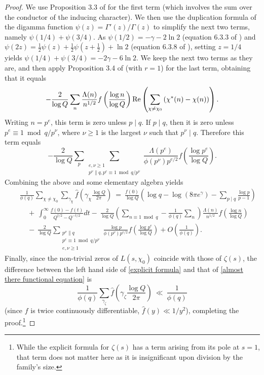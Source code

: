 \documentclass[12pt,reqno]{amsart}
\numberwithin{equation}{section}
\theoremstyle{plain}
\begin{document}
\begin{proof}
We use Proposition 3.3 of \cite{FiMa} for the first term (which involves the sum over the conductor of the inducing character). We then use the duplication formula of the digamma function $\psi(z) = \Gamma'(z)/\Gamma(z)$ to simplify the next two terms, namely $\psi(1/4) + \psi(3/4)$. As $\psi(1/2) = -\gamma-2\ln 2$ (equation 6.3.3 of \cite{AS}) and $\psi(2z) = \frac12\psi(z) + \frac12\psi(z+\frac12)+\ln 2$ (equation 6.3.8 of \cite{AS}), setting $z=1/4$ yields $\psi(1/4)+\psi(3/4) = -2\gamma -6\ln 2$. We keep the next two terms as they are, and then apply Proposition 3.4 of \cite{FiMa} (with $r=1$) for the last term, obtaining that it equals
\begin{equation} -\frac{2}{\log Q} \sum_n \frac{\Lambda(n)}{n^{1/2}} f\left(\frac{\log n}{\log Q}\right) {\rm Re}\left(    \sum_{\chi\neq \chi_0}   \left(\chi^*(n)-\chi(n)\right)\right). \end{equation}
Writing $n=p^e$, this term is zero unless $p\mid q$. If $p\mid q$, then it is zero unless $p^e\equiv 1 \bmod
q/p^\nu$, where $\nu\geq 1$ is the largest $\nu$ such that $p^\nu\mid q$. Therefore this term equals
\begin{equation} -\frac{2}{\log Q} \sum_p \sum_{\substack{e, \nu \ge 1 \\ p^\nu \parallel q, p^e \equiv 1 \bmod q/p^\nu}} \frac{\Lambda(p^e)}{
\phi(p^\nu)p^{e/2}} f\left(\frac{\log p^e}{\log Q}\right).\end{equation} Combining the above and some elementary algebra yields
\begin{eqnarray} & & \frac 1{\phi(q)}\sum_{\chi \neq \chi_0} \sum_{\gamma_{\chi}} \widehat{f}\left(
\gamma_{\chi} \frac{\log Q}{2\pi} \right) \ = \ \frac{f(0)}{\log Q} \left(  \log q -\log(8\pi e^{\gamma})-\sum_{p\mid q}\frac{\log p}{p-1}\right) \nonumber\\
& & \ \ \ \ \ + \ \int_0^{\infty}\frac{f(0)-f(t)}{Q^{t/2}-Q^{-t/2}} dt  - \ \frac 2{\log Q} \left(\sum_{n\equiv 1 \bmod q} - \frac 1{\phi(q)}\sum_n \right) \frac{\Lambda(n)}{n^{1/2}}f\left( \frac{\log n}{\log Q}\right) \nonumber\\
& & \ \ \ \ \ - \ \frac 2{\log Q} \sum_{\substack{p^{\nu}\parallel q \\ p^e \equiv 1 \bmod q/p^{\nu} \\ e, \nu\geq 1}}\frac{\log p}{\phi(p^{\nu})p^{e/2}}f\left( \frac{\log p^{e}}{\log Q}\right)   +O\left(\frac 1{\phi(q)}\right).
\label{almost there functional equation}
\end{eqnarray}
Finally, since the non-trivial zeros of $L(s,\chi_0)$ coincide with those of $\zeta(s)$, the difference between the left hand side of \eqref{explicit formula} and that of \eqref{almost there functional equation} is
\begin{equation} \frac 1{\phi(q)} \sum_{\gamma_\zeta} \widehat{f}\left(
\gamma_\zeta \frac{\log Q}{2\pi} \right)\ \ll\ \frac 1{\phi(q)}\end{equation}
(since $f$ is twice continuously differentiable, $\widehat{f}(y) \ll 1/y^2$),
completing the proof.\footnote{While the explicit formula for $\zeta(s)$ has a term arising from its pole at $s=1$, that term does not matter here as it is insignificant upon division by the family's size.}
\end{proof}
\end{document}
